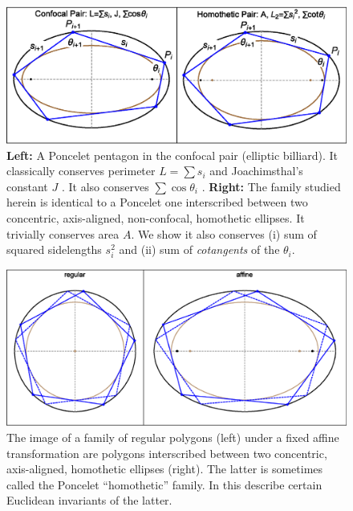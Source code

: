 \begin{figure}
    \centering
    \includegraphics[width=\textwidth]{pics/0010_confocal_homot.eps}
    \caption{\textbf{Left:} A Poncelet pentagon in the confocal pair (elliptic billiard). It classically conserves perimeter $L=\sum{s_i}$ and Joachimsthal's constant $J$ \cite{sergei91}. It also conserves $\sum\cos\theta_i$ \cite{akopyan2020-invariants,bialy2020-invariants,reznik2020-intelligencer}. \textbf{Right:} The family studied herein is identical to a Poncelet one interscribed between two concentric, axis-aligned, non-confocal, homothetic ellipses. It trivially conserves area $A$. We show it also conserves (i) sum of squared sidelengths $s_i^2$ and (ii) sum of {\em cotangents} of the $\theta_i$.}
    \label{fig:confocal_homot}
\end{figure}

\begin{figure}
    \centering
    \includegraphics[width=\textwidth]{pics/0030_affine_regular-caustic.eps}
    \caption{The image of a family of regular polygons (left) under a fixed affine transformation are polygons interscribed between two concentric, axis-aligned, homothetic ellipses (right). The latter is sometimes called the Poncelet ``homothetic'' family. In this describe certain Euclidean invariants of the latter.}
    \label{fig:affine-regular}
\end{figure}

